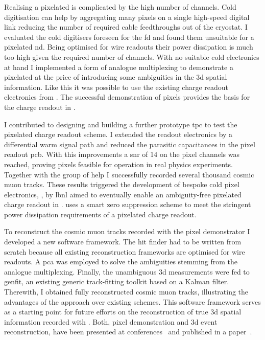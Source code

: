 Realising a pixelated \lartpc{} is complicated by the high number of channels.
Cold digitisation can help by aggregating many pixels on a single high-speed digital link reducing the number of required cable feedthroughs out of the cryostat.
I evaluated the cold digitisers foreseen for the \dune{} \gls{fd} and found them unsuitable for a pixelated \gls{nd}.
Being optimised for wire readouts their power dissipation is much too high given the required number of channels.
With no suitable cold electronics at hand I implemented a form of analogue multiplexing to demonstrate a pixelated \lartpc{} at the price of introducing some ambiguities in the \gls{3d} spatial information.
Like this it was possible to use the existing charge readout electronics from \AT{}.
The successful demonstration of pixels provides the basis for the charge readout in \AC{}.

I contributed to designing and building a further prototype \gls{tpc} to test the pixelated charge readout scheme.
I extended the \AT{} readout electronics by a differential warm signal path and reduced the parasitic capacitances in the pixel readout \gls{pcb}.
With this improvements a \gls{snr} of \num{14} on the pixel channels was reached, proving pixels feasible for operation in real physics experiments.
Together with the \lar{} group of \gls{help} I successfully recorded several thousand cosmic muon tracks.
These results triggered the development of bespoke cold pixel electronics, \larpix{}, by \gls{lbnl} aimed to eventually enable an ambiguity-free pixelated charge readout in \AC{}.
\larpix{} uses a smart zero suppression scheme to meet the stringent power dissipation requirements of a pixelated charge readout.

To reconstruct the cosmic muon tracks recorded with the pixel demonstrator I developed a new software framework.
The hit finder had to be written from scratch because all existing \lartpc{} reconstruction frameworks are optimised for wire readouts.
A \gls{pca} was employed to solve the ambiguities stemming from the analogue multiplexing.
Finally, the unambiguous \gls{3d} measurements were fed to \gls{genfit}, an existing generic track-fitting toolkit based on a Kalman filter.
Therewith, I obtained fully reconstructed cosmic muon tracks, illustrating the advantages of the \AC{} approach over existing schemes.
This software framework serves as a starting point for future efforts on the reconstruction of true \gls{3d} spatial information recorded with \AC{}.
Both, pixel demonstration and \gls{3d} event reconstruction, have been presented at conferences~\cite{pixel_proceedings} and published in a paper~\cite{pixel_paper}.

